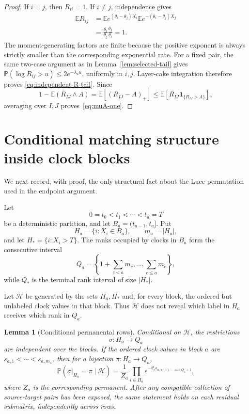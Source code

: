 \documentclass[11pt]{article}
\newcommand{\E}{\mathbb E}
\newcommand{\Pp}{\mathbb P}
\newcommand{\1}{\mathbf 1}
\newcommand{\cH}{\mathcal H}
\newtheorem{lemma}[theorem]{Lemma}
\theoremstyle{definition}
\theoremstyle{remark}
\begin{document}
\begin{proof}
If $i=j$, then $R_{ii}=1$.  If $i\ne j$, independence gives
\begin{align*}
 \E R_{ij}
 &=\E e^{(\theta_i-\theta_j)X_i}
   \E e^{-(\theta_i-\theta_j)X_j}\\
 &=\frac{\theta_i}{\theta_j}\frac{\theta_j}{\theta_i}=1.
\end{align*}
The moment-generating factors are finite because the positive exponent
is always strictly smaller than the corresponding exponential rate.
For a fixed pair, the same two-case argument as in
Lemma~\ref{lem:selected-tail} gives
$\Pp(\log R_{ij}>u)\leq2e^{-\lambda_\kappa u}$, uniformly in
$i,j$.  Layer-cake integration therefore proves
\eqref{eq:independent-R-tail}.  Since
\[
  1-\E(R_{IJ}\wedge A)
  =\E[(R_{IJ}-A)_+]
  \leq \E[R_{IJ}\1_{\{R_{IJ}>A\}}],
\]
averaging over $I,J$ proves~\eqref{eq:muA-one}.
\end{proof}
\section{Conditional matching structure inside clock blocks}
\label{sec:block-structure}

We next record, with proof, the only structural fact about the Luce
permutation used in the endpoint argument.

Let
\[
  0=t_0<t_1<\cdots<t_d=T
\]
be a deterministic partition, and let $B_a=(t_{a-1},t_a]$.  Put
\[
 H_a=\{i:X_i\in B_a\},\qquad m_a=|H_a|,
\]
and let $H_*=\{i:X_i>T\}$.  The ranks occupied by clocks in $B_a$ form
the consecutive interval
\[
 Q_a=\left\{1+\sum_{c<a}m_c,\dots,\sum_{c\leq a}m_c\right\},
\]
while $Q_*$ is the terminal rank interval of size $|H_*|$.

Let $\cH$ be generated by the sets $H_a,H_*$ and, for every block, the
ordered but unlabeled clock values in that block.  Thus $\cH$ does not
reveal which label in $H_a$ receives which rank in $Q_a$.

\begin{lemma}[Conditional permanental rows]
\label{lem:permanental-rows}
Conditional on $\cH$, the restrictions
\[
  \sigma:H_a\longrightarrow Q_a
\]
are independent over the blocks.  If the ordered clock values in block
$a$ are $s_{a,1}<\cdots<s_{a,m_a}$, then for a bijection
$\pi:H_a\to Q_a$,
\begin{equation}\label{eq:row-law}
 \Pp(\sigma|_{H_a}=\pi\mid\cH)
 =\frac{1}{Z_a}
 \prod_{i\in H_a}e^{-\theta_i s_{a,\pi(i)-\min Q_a+1}},
\end{equation}
where $Z_a$ is the corresponding permanent.  After any compatible
collection of source-target pairs has been exposed, the same statement
holds on each residual submatrix, independently across rows.
\end{lemma}
\end{document}
